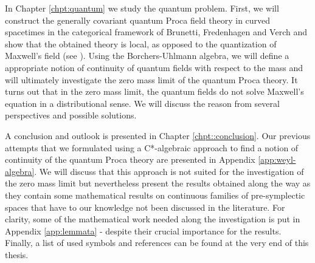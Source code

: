 In Chapter \ref{chpt:quantum} we study the quantum problem. First, we will construct the generally covariant quantum Proca field theory in curved spacetimes in the categorical framework of Brunetti, Fredenhagen and Verch and show that the obtained theory is local, as opposed to the quantization of Maxwell's field (see \cite{Dappiaggi2012,Sanders}). Using the Borchers-Uhlmann algebra, we will define a appropriate notion of continuity of quantum fields with respect to the mass and will ultimately investigate the zero mass limit of the quantum Proca theory. It turns out that in the zero mass limit, the quantum fields do not solve Maxwell's equation in a distributional sense. We will discuss the reason from several perspectives and possible solutions. \par
A conclusion and outlook is presented in Chapter \ref{chpt::conclusion}. Our previous attempts that we formulated using a C*-algebraic approach to find a notion of continuity of the quantum Proca theory are presented in Appendix \ref{app:weyl-algebra}. We will discuss that this approach is not suited for the investigation of the zero mass limit but nevertheless present the results obtained along the way as they contain some mathematical results on continuous families of pre-symplectic spaces that have to our knowledge not been discussed in the literature. For clarity, some of the mathematical work needed along the investigation is put in Appendix \ref{app:lemmata} - despite their crucial importance for the results. Finally, a list of used symbols and references can be found at the very end of this thesis.
%
%
%
%
%
%
%
%
%
%
%
